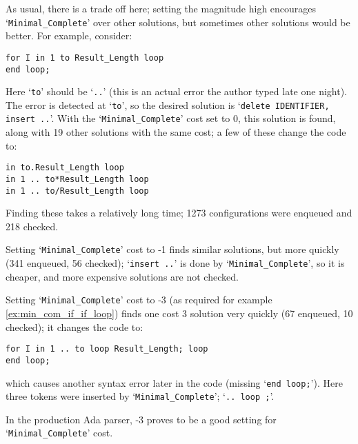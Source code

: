 \documentclass{article}
\newcommand{\code}[1]{`{\tt #1}'}
\begin{document}
As usual, there is a trade off here; setting the magnitude high
encourages \code{Minimal\_Complete} over other solutions, but sometimes
other solutions would be better. For example, consider:
\begin{verbatim}
for I in 1 to Result_Length loop
end loop;
\end{verbatim}
Here \code{to} should be \code{..} (this is an actual error the author
typed late one night). The error is detected at \code{to}, so the
desired solution is \code{delete IDENTIFIER, insert ..}. With the
\code{Minimal\_Complete} cost set to 0, this solution is found, along
with 19 other solutions with the same cost; a few of these change the
code to:

\begin{verbatim}
in to.Result_Length loop
in 1 .. to*Result_Length loop
in 1 .. to/Result_Length loop
\end{verbatim}

Finding these takes a relatively long time; 1273 configurations
were enqueued and 218 checked.

Setting \code{Minimal\_Complete} cost to -1 finds similar solutions,
but more quickly (341 enqueued, 56 checked); \code{insert ..} is done
by \code{Minimal\_Complete}, so it is cheaper, and more expensive
solutions are not checked.

Setting \code{Minimal\_Complete} cost to -3 (as required for
example \ref{ex:min_com_if_if_loop}) finds one cost 3 solution very
quickly (67 enqueued, 10 checked); it changes the code to:
\begin{verbatim}
for I in 1 .. to loop Result_Length; loop
end loop;
\end{verbatim}
which causes another syntax error later in the code (missing
\code{end loop;}). Here three tokens were inserted by
\code{Minimal\_Complete}; \code{.. loop ;}.

In the production Ada parser, -3 proves to be a good setting for
\code{Minimal\_Complete} cost.
\end{document}
